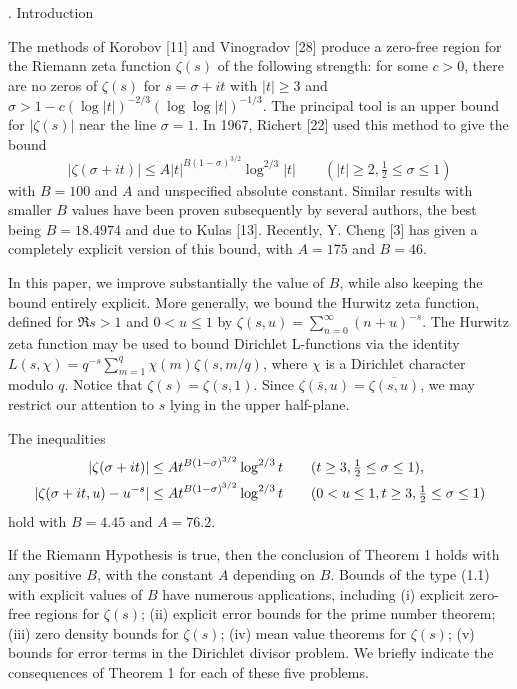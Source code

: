 \document
. Introduction \endhead


The methods of Korobov [11] and Vinogradov [28]  produce a zero-free region
for the Riemann zeta function $\zeta(s)$ of the following strength: for
some $c>0$, there
are no zeros of $\zeta(s)$ for $s=\sigma+it$ with $|t|\ge 3$ and
$\sigma>1-c(\log |t|)^{-2/3} (\log\log |t|)^{-1/3}$.  The principal tool
is an upper bound for $|\zeta(s)|$ near the line $\sigma=1$.  In 1967,
Richert [22] used this method to give 
the bound 
$$
|\zeta(\sigma+it)| \le A |t|^{B(1-\sigma)^{3/2}} \log^{2/3} |t|
\qquad (|t|\ge 2, \tfrac12 \le \sigma \le 1) \tag{1.1}
$$
with $B=100$ and $A$ and unspecified absolute constant.
Similar results with smaller $B$ values
have been proven subsequently by several authors, the best being $B=18.4974$
 and due to Kulas [13].  Recently,
Y. Cheng [3] has given a completely explicit version of this bound,
with $A=175$ and $B=46$. 

In this paper, we improve substantially the value of $B$, while also keeping
the bound entirely explicit.  More generally, we bound the Hurwitz zeta
function, defined for $\Re s > 1$ and $0<u\le 1$ by
$\zeta(s,u)= \sum_{n=0}^\infty (n+u)^{-s}$. 
The Hurwitz zeta function may be used to bound Dirichlet L-functions via
the identity
$L(s,\chi) = q^{-s} \sum_{m=1}^{q} \chi(m) \zeta(s,m/q)$,
where $\chi$ is a Dirichlet character modulo $q$. 
Notice that $\zeta(s)=\zeta(s,1)$.   Since $\zeta(\bar{s},u)=
\overline{\zeta(s,u)}$, we may restrict our attention to $s$ lying in the
upper half-plane.

 The inequalities
$$
\split
| \zeta(\sigma+it)| &\le A t^{B(1-\sigma)^{3/2}} \log^{2/3} t
 \qquad (t\ge 3, \tfrac12 \le \sigma \le 1), \\
| \zeta(\sigma+it,u)-u^{-s}| &\le A t^{B(1-\sigma)^{3/2}} \log^{2/3} t
 \qquad (0<u\le 1, t\ge 3, \tfrac12 \le \sigma \le 1)
\endsplit
$$
hold with $B=4.45$ and $A=76.2$.
\endproclaim

If the Riemann Hypothesis is true, then the conclusion of Theorem 1 holds
with any positive $B$, with the constant $A$ depending on $B$.
Bounds of the type (1.1) with explicit values of $B$
have numerous applications, including (i) explicit zero-free regions
for $\zeta(s)$; (ii) explicit error bounds for the prime number theorem;
(iii) zero density bounds for $\zeta(s)$; (iv) mean value theorems for
$\zeta(s)$; (v) bounds for error terms in the Dirichlet divisor problem.
We briefly indicate the consequences of Theorem 1 for each of these five
problems.

